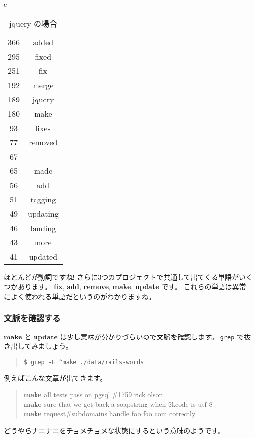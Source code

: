 \documentclass{jarticle}
\begin{document}
\begin{table}[htbp]
\begin{center}
\begin{tabular}{c}
     \begin{minipage}{0.3\hsize}
      \begin{center}
       \caption{jquery の場合}
       \begin{tabular}{c|c}
        \hline
        366 & added \\
        295 & fixed \\
        251 & fix \\
        192 & merge \\
        189 & jquery \\
        180 & make \\
        93 & fixes \\
        77 & removed \\
        67 & - \\
        65 & made \\
        56 & add \\
        51 & tagging \\
        49 & updating \\
        46 & landing \\
        43 & more \\
        41 & updated \\
        \hline
       \end{tabular}
      \end{center}
     \end{minipage}

    \end{tabular}
   \end{center}
  \end{table}

  ほとんどが動詞ですね!
  さらに3つのプロジェクトで共通して出てくる単語がいくつかあります。
  {\bf fix}, {\bf add}, {\bf remove}, {\bf make}, {\bf update} です。
  これらの単語は異常によく使われる単語だというのがわかりますね。

   \subsubsection{文脈を確認する}

   {\bf make} と {\bf update} は少し意味が分かりづらいので文脈を確認します。
   {\tt grep} で抜き出してみましょう。

   \begin{quote}
    {\tt \$ grep -E \textasciicircum make ./data/rails-words }
   \end{quote}

   例えばこんな文章が出てきます。
   \begin{quote}
    {\bf make} all tests pass on pgsql \#1759 rick olson\\
    {\bf make} sure that we get back a soapstring when \$kcode is utf-8\\
    {\bf make} request\#subdomains handle foo foo com correctly\\
   \end{quote}
   どうやらナニナニをチョメチョメな状態にするという意味のようです。
\end{document}
